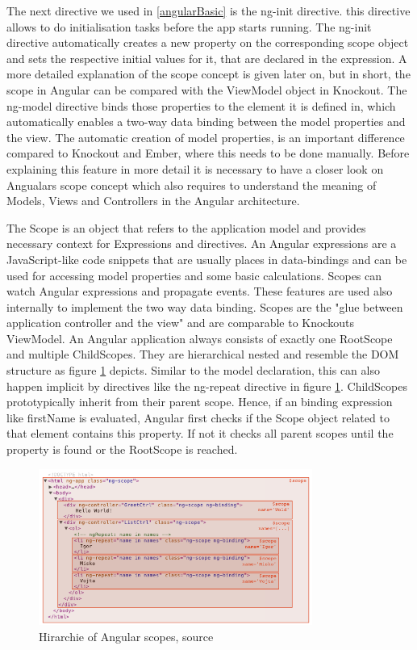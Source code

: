 The next directive we used in \ref{angularBasic} is the ng-init directive.
this directive allows to do initialisation tasks before the app starts running.
The ng-init directive automatically creates a new property on the corresponding scope object and sets the respective initial values for it, that are declared in the expression. A more detailed explanation of the scope concept is given later on, but in short, the scope in Angular can be compared with the ViewModel object in Knockout.
The ng-model directive binds those properties to the element it is defined in, which automatically enables a two-way data binding between the model properties and the view.
The automatic creation of model properties, is an important difference compared to Knockout and Ember, where this needs to be done manually.  
Before explaining this feature in more detail it is necessary to have a closer look on Angualars scope concept which also requires to understand the meaning of Models, Views and Controllers in the Angular architecture.

The Scope is an object that refers to the application model and provides necessary context for Expressions and directives.
An Angular expressions are a JavaScript-like code snippets that are usually places in data-bindings and can be used for accessing model properties and some basic calculations.
Scopes can watch Angular expressions and propagate events.
These features are used also internally to implement the two way data binding.
Scopes are the "glue between application controller and the view" \autocite{tech-ana:ng-scope} and are comparable to Knockouts ViewModel.
An Angular application always consists of exactly one RootScope and multiple ChildScopes.
They are hierarchical nested and resemble the DOM structure as figure \ref{fig:angular_scopes} depicts.
Similar to the model declaration, this can also happen implicit by directives like the ng-repeat directive in figure \ref{fig:angular_scopes}.
ChildScopes prototypically inherit from their parent scope.
Hence, if an binding expression like {{firstName}} is evaluated, Angular first checks if the Scope object related to that element contains this property.
If not it checks all parent scopes until the property is found or the RootScope is reached.

\begin{figure}
	\centering	
	\includegraphics[width=0.8\textwidth]{./img/tech-ana/angular_scopes.png}
	\caption{Hirarchie of Angular scopes, source \autocite{tech-ana:ng-scope}}
	\label{fig:angular_scopes}
\end{figure} 

